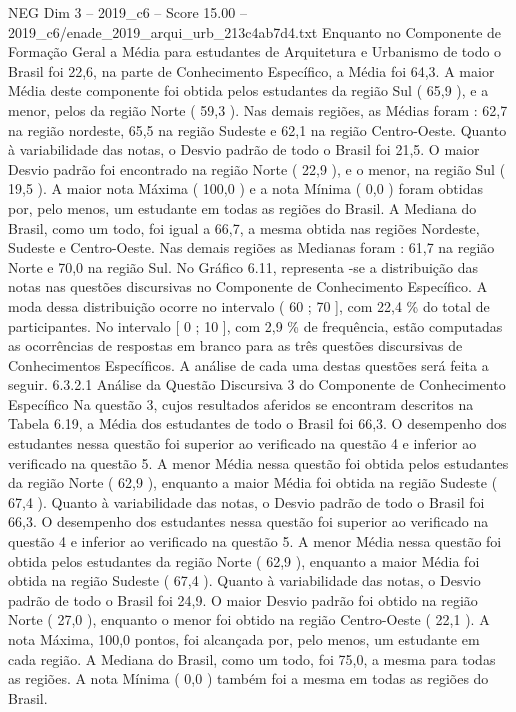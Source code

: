 \begin{textsample}{NEG Dim 3 – 2019\_c6 – Score 15.00 – 2019\_c6/enade\_2019\_arqui\_urb\_213c4ab7d4.txt}
Enquanto no Componente de Formação Geral a Média para estudantes de Arquitetura e Urbanismo de todo o Brasil foi 22,6, na parte de Conhecimento Específico, a Média foi 64,3.
A maior Média deste componente foi obtida pelos estudantes da região Sul ( 65,9 ), e a menor, pelos da região Norte ( 59,3 ).
Nas demais regiões, as Médias foram : 62,7 na região nordeste, 65,5 na região Sudeste e 62,1 na região Centro-Oeste.
Quanto à variabilidade das notas, o Desvio padrão de todo o Brasil foi 21,5.
O maior Desvio padrão foi encontrado na região Norte ( 22,9 ), e o menor, na região Sul ( 19,5 ).
A maior nota Máxima ( 100,0 ) e a nota Mínima ( 0,0 ) foram obtidas por, pelo menos, um estudante em todas as regiões do Brasil.
A Mediana do Brasil, como um todo, foi igual a 66,7, a mesma obtida nas regiões Nordeste, Sudeste e Centro-Oeste.
Nas demais regiões as Medianas foram : 61,7 na região Norte e 70,0 na região Sul.
No Gráfico 6.11, representa -se a distribuição das notas nas questões discursivas no Componente de Conhecimento Específico.
A moda dessa distribuição ocorre no intervalo ( 60 ; 70 ], com 22,4 \% do total de participantes.
No intervalo [ 0 ; 10 ], com 2,9 \% de frequência, estão computadas as ocorrências de respostas em branco para as três questões discursivas de Conhecimentos Específicos.
A análise de cada uma destas questões será feita a seguir. 6.3.2.1 Análise da Questão Discursiva 3 do Componente de Conhecimento Específico Na questão 3, cujos resultados aferidos se encontram descritos na Tabela 6.19, a Média dos estudantes de todo o Brasil foi 66,3.
O desempenho dos estudantes nessa questão foi superior ao verificado na questão 4 e inferior ao verificado na questão 5.
A menor Média nessa questão foi obtida pelos estudantes da região Norte ( 62,9 ), enquanto a maior Média foi obtida na região Sudeste ( 67,4 ).
Quanto à variabilidade das notas, o Desvio padrão de todo o Brasil foi 66,3.
O desempenho dos estudantes nessa questão foi superior ao verificado na questão 4 e inferior ao verificado na questão 5.
A menor Média nessa questão foi obtida pelos estudantes da região Norte ( 62,9 ), enquanto a maior Média foi obtida na região Sudeste ( 67,4 ).
Quanto à variabilidade das notas, o Desvio padrão de todo o Brasil foi 24,9.
O maior Desvio padrão foi obtido na região Norte ( 27,0 ), enquanto o menor foi obtido na região Centro-Oeste ( 22,1 ).
A nota Máxima, 100,0 pontos, foi alcançada por, pelo menos, um estudante em cada região.
A Mediana do Brasil, como um todo, foi 75,0, a mesma para todas as regiões.
A nota Mínima ( 0,0 ) também foi a mesma em todas as regiões do Brasil.

\end{textsample}
